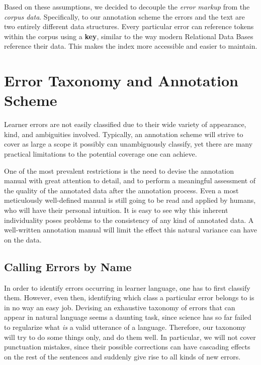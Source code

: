 \documentclass{scrartcl}
\begin{document}
Based on these assumptions, we decided to decouple the \textit{error markup}
from the \textit{corpus data}. Specifically, to our annotation scheme the
errors and the text are two entirely different data structures. Every
particular error can reference tokens within the corpus using a \textbf{key},
similar to the way modern Relational Data Bases reference their data. This makes
the index more accessible and easier to maintain.

\section{Error Taxonomy and Annotation Scheme}\label{sec:scheme}

Learner errors are not easily classified due to their wide variety of
appearance, kind, and ambiguities involved. Typically, an annotation scheme will
strive to cover as large a scope it possibly can unambiguously classify, yet
there are many practical limitations to the potential coverage one can achieve.

One of the most prevalent restrictions is the need to devise the annotation
manual with great attention to detail, and to perform a meaningful assessment of
the quality of the annotated data after the annotation process. Even a most
meticulously well-defined manual is still going to be read and applied by
humans, who will have their personal intuition. It is easy to see
why this inherent individuality poses problems to the consistency of any kind of
annotated data. A well-written annotation manual will limit the effect this
natural variance can have on the data.

\subsection{Calling Errors by Name}\label{sec:taxonomy}

In order to identify errors occurring in learner language, one has to first
classify them. However, even then, identifying which class a particular error
belongs to is in no way an easy job. Devising an exhaustive taxonomy of errors
that can appear in natural language seems a daunting task, since science has so
far failed to regularize what \textit{is} a valid utterance of a language.
Therefore, our taxonomy will try to do some things only, and do them well. In
particular, we will not cover punctuation mistakes, since their possible
corrections can have cascading effects on the rest of the sentences and suddenly
give rise to all kinds of new errors.
\end{document}
